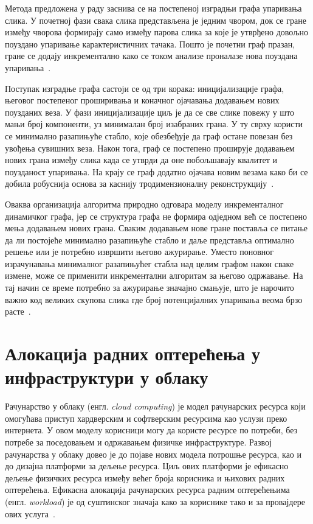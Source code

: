 Метода предложена у раду \cite{shenGraphBasedConsistentMatching2016} заснива се на постепеној изградњи графа упаривања слика. У почетној фази свака слика представљена је једним чвором, док се гране између чворова формирају само између парова слика за које је утврђено довољно поуздано упаривање карактеристичних тачака. Пошто је почетни граф празан, гране се додају инкрементално како се током анализе проналазе нова поуздана упаривања~\cite{shenGraphBasedConsistentMatching2016}.

Поступак изградње графа састоји се од три корака: иницијализације графа, његовог постепеног проширивања и коначног ојачавања додавањем нових поузданих веза. У фази иницијализације циљ је да се све слике повежу у што мањи број компоненти, уз минималан број изабраних грана. У ту сврху користи се минимално разапињуће стабло, које обезбеђује да граф остане повезан без увођења сувишних веза. Након тога, граф се постепено проширује додавањем нових грана између слика када се утврди да оне побољшавају квалитет и поузданост упаривања. На крају се граф додатно ојачава новим везама како би се добила робуснија основа за каснију тродимензионалну реконструкцију~\cite{shenGraphBasedConsistentMatching2016}.

Оваква организација алгоритма природно одговара моделу инкременталног динамичког графа, јер се структура графа не формира одједном већ се постепено мења додавањем нових грана. Сваким додавањем нове гране поставља се питање да ли постојеће минимално разапињуће стабло и даље представља оптимално решење или је потребно извршити његово ажурирање. Уместо поновног израчунавања минималног разапињућег стабла над целим графом након сваке измене, може се применити инкрементални алгоритам за његово одржавање. На тај начин се време потребно за ажурирање значајно смањује, што је нарочито важно код великих скупова слика где број потенцијалних упаривања веома брзо расте~\cite{shenGraphBasedConsistentMatching2016}.

\section{Алокација радних оптерећења у инфраструктури у облаку}

Рачунарство у облаку (енгл. \textit{cloud computing}) је модел рачунарских ресурса који омогућава приступ хардверским и софтверским ресурсима као услузи преко интернета. У овом моделу корисници могу да користе ресурсе по потреби, без потребе за поседовањем и одржавањем физичке инфраструктуре. Развој рачунарства у облаку довео је до појаве нових модела потрошње ресурса, као и до дизајна платформи за дељење ресурса. Циљ ових платформи је ефикасно дељење физичких ресурса између већег броја корисника и њихових радних оптерећења. Ефикасна алокација рачунарских ресурса радним оптерећењима (енгл. \textit{workload}) је од суштинског значаја како за кориснике тако и за провајдере ових услуга~\cite{perez-salazarDynamicResourceAllocation2022a}.  

